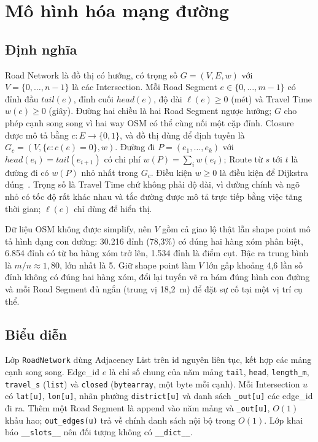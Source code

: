 \section{Mô hình hóa mạng đường}\label{sec:graph}

\subsection{Định nghĩa}

Road Network là đồ thị có hướng, có trọng số $G=(V,E,w)$ với $V=\{0,\dots,n-1\}$ là các Intersection. Mỗi Road Segment $e\in\{0,\dots,m-1\}$ có đỉnh đầu $\mathit{tail}(e)$, đỉnh cuối $\mathit{head}(e)$, độ dài $\ell(e)\ge 0$ (mét) và Travel Time $w(e)\ge 0$ (giây). Đường hai chiều là hai Road Segment ngược hướng; $G$ cho phép cạnh song song vì hai way OSM có thể cùng nối một cặp đỉnh. Closure được mô tả bằng $c:E\to\{0,1\}$, và đồ thị dùng để định tuyến là $G_c=(V,\{e : c(e)=0\},w)$. Đường đi $P=(e_1,\dots,e_k)$ với $\mathit{head}(e_i)=\mathit{tail}(e_{i+1})$ có chi phí $w(P)=\sum_i w(e_i)$; Route từ $s$ tới $t$ là đường đi có $w(P)$ nhỏ nhất trong $G_c$. Điều kiện $w\ge 0$ là điều kiện để Dijkstra đúng~\cite{dijkstra1959,clrs2022}. Trọng số là Travel Time chứ không phải độ dài, vì đường chính và ngõ nhỏ có tốc độ rất khác nhau và tắc đường được mô tả trực tiếp bằng việc tăng thời gian; $\ell(e)$ chỉ dùng để hiển thị.

Dữ liệu OSM không được simplify, nên $V$ gồm cả giao lộ thật lẫn shape point mô tả hình dạng con đường: 30.216 đỉnh (78,3\%) có đúng hai hàng xóm phân biệt, 6.854 đỉnh có từ ba hàng xóm trở lên, 1.534 đỉnh là điểm cụt. Bậc ra trung bình là $m/n\approx 1{,}80$, lớn nhất là 5. Giữ shape point làm $V$ lớn gấp khoảng 4,6 lần số đỉnh không có đúng hai hàng xóm, đổi lại tuyến vẽ ra bám đúng hình con đường và mỗi Road Segment đủ ngắn (trung vị 18,2~m) để đặt sự cố tại một vị trí cụ thể.

\subsection{Biểu diễn}

Lớp \texttt{RoadNetwork} dùng Adjacency List trên id nguyên liên tục, kết hợp các mảng cạnh song song. Edge\_id $e$ là chỉ số chung của năm mảng \texttt{tail}, \texttt{head}, \texttt{length\_m}, \texttt{travel\_s} (\texttt{list}) và \texttt{closed} (\texttt{bytearray}, một byte mỗi cạnh). Mỗi Intersection $u$ có \texttt{lat[u]}, \texttt{lon[u]}, nhãn phường \texttt{district[u]} và danh sách \texttt{\_out[u]} các edge\_id đi ra. Thêm một Road Segment là append vào năm mảng và \texttt{\_out[u]}, $O(1)$ khấu hao; \texttt{out\_edges(u)} trả về chính danh sách nội bộ trong $O(1)$. Lớp khai báo \texttt{\_\_slots\_\_} nên đối tượng không có \texttt{\_\_dict\_\_}.

